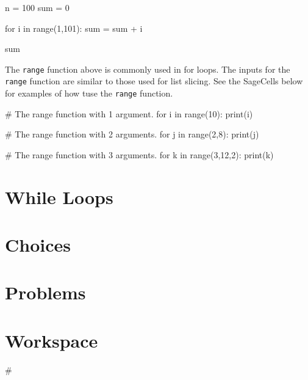 \documentclass{ximera}
\begin{document}
\begin{sageCell}
n = 100
sum = 0

for i in range(1,101):
        sum = sum + i

sum
\end{sageCell}

The \verb|range| function above is commonly used in for loops. The inputs for the \verb|range| function are similar to those used for list slicing. See the SageCells below for examples of how tuse the \verb|range| function.

\begin{sageCell}
# The range function with 1 argument.
for i in range(10):
     print(i)
\end{sageCell}

\begin{sageCell}
# The range function with 2 arguments.
for j in range(2,8):
     print(j)
\end{sageCell}

\begin{sageCell}
# The range function with 3 arguments.
for k in range(3,12,2):
     print(k)
\end{sageCell}

\section{While Loops}



\section{Choices}



\section{Problems}

\begin{question}
\end{question}

\begin{question}
\end{question}

\section{Workspace}

\begin{sageCell}
#
\end{sageCell}
\end{document}
